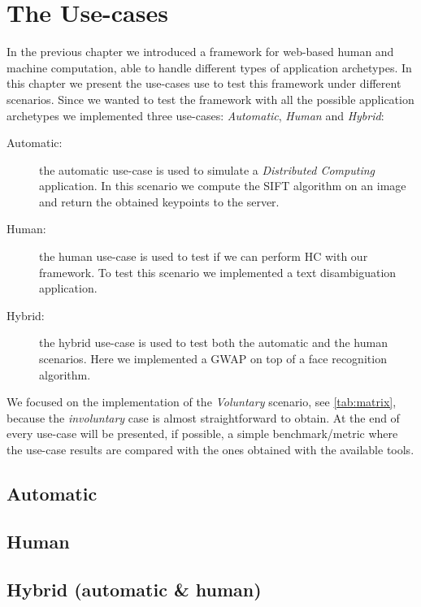 \chapter{The Use-cases}
\label{cap:cases}

In the previous chapter we introduced a framework for web-based human and machine
computation, able to handle different types of application archetypes. In this
chapter we present the use-cases use to test this framework under different
scenarios. Since we wanted to test the framework with all the possible application
archetypes we implemented three use-cases: \emph{Automatic}, \emph{Human} and
\emph{Hybrid}:
\begin{description}
    \item[Automatic:] the automatic use-case is used to simulate a
    \emph{Distributed Computing} application. In this scenario we compute the
    SIFT algorithm on an image and return the obtained keypoints to the server.
    \item[Human:] the human use-case is used to test if we can perform \acl{HC}
    with our framework. To test this scenario we implemented a text disambiguation
    application.
    \item[Hybrid:] the hybrid use-case is used to test both the automatic and the
    human scenarios. Here we implemented a \ac{GWAP} on top of a face recognition
    algorithm.
\end{description}
\noindent We focused on the implementation of the \emph{Voluntary} scenario, see
\autoref{tab:matrix}, because the \emph{involuntary} case is almost straightforward
to obtain.
At the end of every use-case will be presented, if possible, a simple
benchmark/metric where the use-case results are compared with the ones obtained
with the available tools. 



\section{Automatic}
\label{sec:cases:automatic}


\section{Human}
\label{sec:cases:human}



\section{Hybrid (automatic \& human)}
\label{sec:cases:hybrid}

